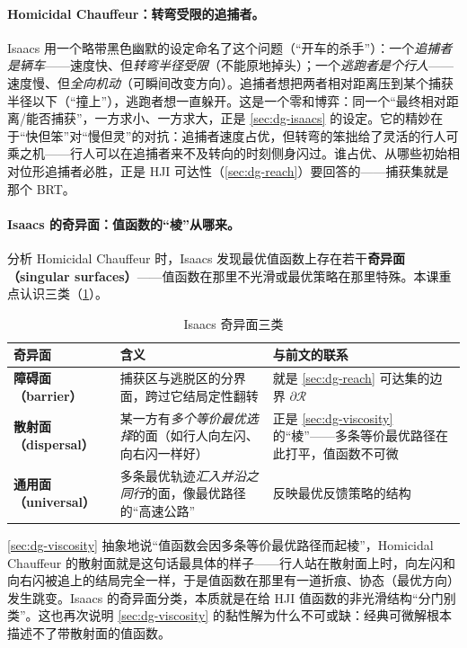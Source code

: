 \paragraph{Homicidal Chauffeur：转弯受限的追捕者。}
Isaacs 用一个略带黑色幽默的设定命名了这个问题（“开车的杀手”）：一个\emph{追捕者是辆车}——速度快、但\emph{转弯半径受限}（不能原地掉头）；一个\emph{逃跑者是个行人}——速度慢、但\emph{全向机动}（可瞬间改变方向）。追捕者想把两者相对距离压到某个捕获半径以下（“撞上”），逃跑者想一直躲开。这是一个零和博弈：同一个“最终相对距离/能否捕获”，一方求小、一方求大，正是 \cref{sec:dg-isaacs} 的设定。它的精妙在于“快但笨”对“慢但灵”的对抗：追捕者速度占优，但转弯的笨拙给了灵活的行人可乘之机——行人可以在追捕者来不及转向的时刻侧身闪过。谁占优、从哪些初始相对位形追捕者必胜，正是 HJI 可达性（\cref{sec:dg-reach}）要回答的——捕获集就是那个 BRT。

\paragraph{Isaacs 的奇异面：值函数的“棱”从哪来。}
分析 Homicidal Chauffeur 时，Isaacs 发现最优值函数上存在若干\textbf{奇异面（singular surfaces）}——值函数在那里不光滑或最优策略在那里特殊。本课重点认识三类（\cref{tab:dg-singular}）。

\begin{table}[H]\centering\small
\caption{Isaacs 奇异面三类}
\label{tab:dg-singular}
\begin{tabular}{p{} p{} p{}}
\toprule
奇异面 & 含义 & 与前文的联系 \\
\midrule
\textbf{障碍面（barrier）} & 捕获区与逃脱区的分界面，跨过它结局定性翻转 & 就是 \cref{sec:dg-reach} 可达集的边界 $\partial\mathcal{R}$ \\
\textbf{散射面（dispersal）} & 某一方有\emph{多个等价最优选择}的面（如行人向左闪、向右闪一样好） & 正是 \cref{sec:dg-viscosity} 的“棱”——多条等价最优路径在此打平，值函数不可微 \\
\textbf{通用面（universal）} & 多条最优轨迹\emph{汇入并沿之同行}的面，像最优路径的“高速公路” & 反映最优反馈策略的结构 \\
\bottomrule
\end{tabular}
\end{table}

\begin{insight}
\cref{sec:dg-viscosity} 抽象地说“值函数会因多条等价最优路径而起棱”，Homicidal Chauffeur 的散射面就是这句话最具体的样子——行人站在散射面上时，向左闪和向右闪被追上的结局完全一样，于是值函数在那里有一道折痕、协态（最优方向）发生跳变。Isaacs 的奇异面分类，本质就是在给 HJI 值函数的非光滑结构“分门别类”。这也再次说明 \cref{sec:dg-viscosity} 的黏性解为什么不可或缺：经典可微解根本描述不了带散射面的值函数。
\end{insight}


